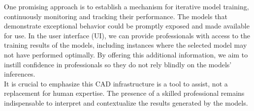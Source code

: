 One promising approach is to establish a mechanism for iterative model
training, continuously monitoring and tracking their performance. The models
that demonstrate exceptional behavior could be promptly exposed and made
available for use. In the user interface (UI), we can provide professionals
with access to the training results of the models, including instances where
the selected model may not have performed optimally. By offering this
additional information, we aim to instill confidence in professionals so they
do not rely blindly on the models' inferences. \\

It is crucial to emphasize this CAD infrastructure is a tool to assist, not a
replacement for human expertise. The presence of a skilled professional remains
indispensable to interpret and contextualize the results generated by the
models.
